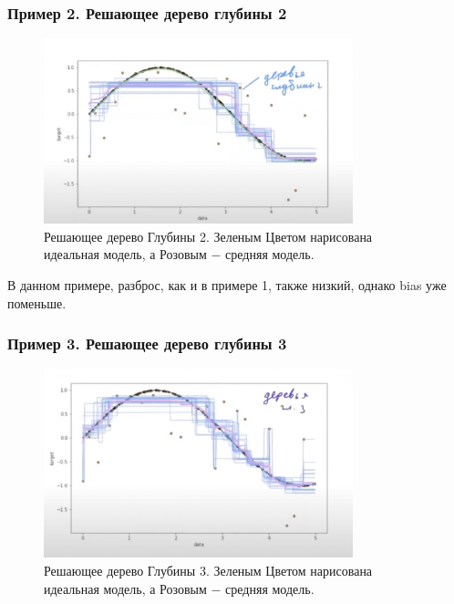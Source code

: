         \subsubsection{Пример 2. Решающее дерево глубины 2}
            \begin{figure}[H]
                \centering
                \includegraphics[width=0.8\textwidth]{images/9lecture/ex2.png}
                \caption{Решающее дерево Глубины 2. Зеленым Цветом нарисована идеальная модель, а Розовым $-$ средняя модель.}
            \end{figure}

            В данном примере, разброс, как и в примере 1, также низкий, однако bias уже поменьше.

        \subsubsection{Пример 3. Решающее дерево глубины 3}

            \begin{figure}[H]
                \centering
                \includegraphics[width=0.8\textwidth]{images/9lecture/ex3.png}
                \caption{Решающее дерево Глубины 3. Зеленым Цветом нарисована идеальная модель, а Розовым $-$ средняя модель.}
            \end{figure}

